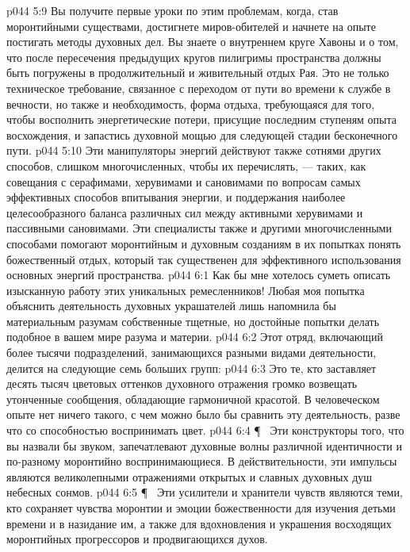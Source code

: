 \vs p044 5:9 Вы получите первые уроки по этим проблемам, когда, став моронтийными существами, достигнете миров\hyp{}обителей и начнете на опыте постигать методы духовных дел. Вы знаете о внутреннем круге Хавоны и о том, что после пересечения предыдущих кругов пилигримы пространства должны быть погружены в продолжительный и живительный отдых Рая. Это не только техническое требование, связанное с переходом от пути во времени к службе в вечности, но также и необходимость, форма отдыха, требующаяся для того, чтобы восполнить энергетические потери, присущие последним ступеням опыта восхождения, и запастись духовной мощью для следующей стадии бесконечного пути.
\vs p044 5:10 Эти манипуляторы энергий действуют также сотнями других способов, слишком многочисленных, чтобы их перечислять, --- таких, как совещания с серафимами, херувимами и сановимами по вопросам самых эффективных способов впитывания энергии, и поддержания наиболее целесообразного баланса различных сил между активными херувимами и пассивными сановимами. Эти специалисты также и другими многочисленными способами помогают моронтийным и духовным созданиям в их попытках понять божественный отдых, который так существенен для эффективного использования основных энергий пространства.
\vs p044 6:1 Как бы мне хотелось суметь описать изысканную работу этих уникальных ремесленников! Любая моя попытка объяснить деятельность духовных украшателей лишь напомнила бы материальным разумам собственные тщетные, но достойные попытки делать подобное в вашем мире разума и материи.
\vs p044 6:2 Этот отряд, включающий более тысячи подразделений, занимающихся разными видами деятельности, делится на следующие семь больших групп:
\vs p044 6:3 \bibnobreakspace {} Это те, кто заставляет десять тысяч цветовых оттенков духовного отражения громко возвещать утонченные сообщения, обладающие гармоничной красотой. В человеческом опыте нет ничего такого, с чем можно было бы сравнить эту деятельность, разве что со способностью воспринимать цвет.
\vs p044 6:4 \P\ \bibnobreakspace {} Эти конструкторы того, что вы назвали бы звуком, запечатлевают духовные волны различной идентичности и по\hyp{}разному моронтийно воспринимающиеся. В действительности, эти импульсы являются великолепными отражениями открытых и славных духовных душ небесных сонмов.
\vs p044 6:5 \P\ \bibnobreakspace {} Эти усилители и хранители чувств являются теми, кто сохраняет чувства моронтии и эмоции божественности для изучения детьми времени и в назидание им, а также для вдохновления и украшения восходящих моронтийных прогрессоров и продвигающихся духов.
